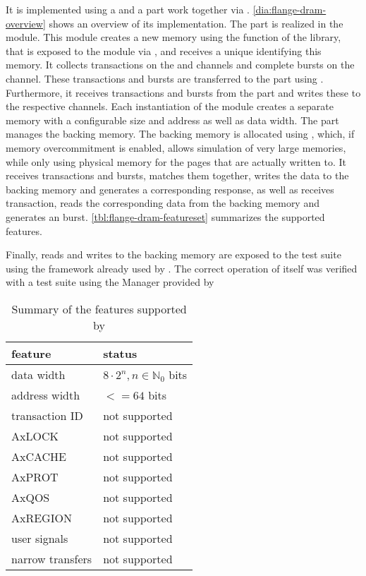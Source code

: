 It is implemented using a \systemverilog{} and a \cpp{} part work together via \DPI{}. \autoref{dia:flange-dram-overview} shows an overview of its implementation. The \systemverilog{} part is realized in the  module. This module creates a new memory using the  function of the \flangedram{} library, that is exposed to the module via \DPI{}, and receives a unique  identifying this memory. It collects transactions on the \AW{} and \AR{} \AXI{} channels and complete bursts on the \W{} \AXI{} channel. These transactions and bursts are transferred to the \cpp{} part using \DPI{}. Furthermore, it receives \B{} transactions and \R{} bursts from the \cpp{} part and writes these to the respective \AXI{} channels. Each instantiation of the  module creates a separate memory with a configurable size and address as well as data width.
The \cpp{} part manages the backing memory. The backing memory is allocated using \mmap{}, which, if memory overcommitment is enabled, allows simulation of very large memories, while only using physical memory for the pages that are actually written to. It receives \AW{} transactions and \W{} bursts, matches them together, writes the data to the backing memory and generates a corresponding \B{} response, as well as receives \AR{} transaction, reads the corresponding data from the backing memory and generates an \R{} burst. \autoref{tbl:flange-dram-featureset} summarizes the supported \AXI{} features.

Finally, reads and writes to the backing memory are exposed to the test suite using the \RCF{} framework already used by \flange{}.
The correct operation of \flangedram{} itself was verified with a test suite using the \AXI{} Manager provided by \cocotb{}

\begin{table}
  \begin{center}
\begin{tabular}{ll}
  \toprule
  feature & status \\
  \midrule
  data width & $8 · 2^{n}, n ∈ ℕ_{0}$ bits \\
  address width & $<= 64$ bits \\
  transaction ID & not supported \\
  AxLOCK & not supported \\
  AxCACHE & not supported \\
  AxPROT & not supported \\
  AxQOS & not supported \\
  AxREGION & not supported \\
  user signals & not supported \\
  narrow transfers & not supported \\
  \bottomrule
\end{tabular}
  \end{center}
\caption{Summary of the \AXI{} features supported by \flangedram}\label{tbl:flange-dram-featureset}
\end{table}

